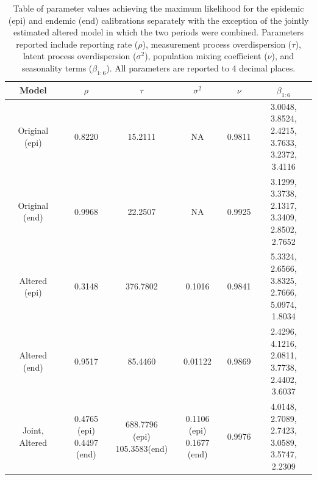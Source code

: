 \documentclass[12pt]{article}
\begin{document}
\renewcommand{\thefigure}{A\arabic{figure}}
\setcounter{figure}{0}
\renewcommand{\thetable}{A\arabic{table}}
\setcounter{table}{0}
\begin{table}[H]
\caption{Table of parameter values achieving the maximum likelihood for the epidemic (epi) and endemic (end) calibrations separately with the exception of the jointly estimated altered model in which the two periods were combined. Parameters reported include reporting rate ($\rho$), measurement process overdispersion ($\tau$), latent process overdispersion ($\sigma^2$), population mixing coefficient ($\nu$), and seasonality terms ($\beta_{1:6}$). All parameters are reported to 4 decimal places.}
\label{tab:A1}
\begin{center}
\begin{tabular}{||c | c c c c c ||}
 \hline
 Model & $\rho$ & $\tau$ & $\sigma^2$ & $\nu$ & $\beta_{1:6}$ \\ [0.5ex]
 \hline\hline
 Original (epi) & 0.8220 & 15.2111 & NA & 0.9811 & \makecell{3.0048, 3.8524,\\2.4215, 3.7633,\\3.2372, 3.4116}\\
 \hline
 Original (end) & 0.9968 & 22.2507 & NA & 0.9925 & \makecell{3.1299, 3.3738,\\2.1317, 3.3409,\\2.8502, 2.7652}\\
 \hline
 Altered (epi) & 0.3148 & 376.7802 & 0.1016 & 0.9841 & \makecell{5.3324, 2.6566,\\3.8325, 2.7666,\\5.0974, 1.8034}\\
 \hline
 Altered (end) & 0.9517 & 85.4460 & 0.01122 & 0.9869 & \makecell{2.4296, 4.1216,\\2.0811, 3.7738,\\2.4402, 3.6037}\\
 \hline
 Joint, Altered & \makecell{0.4765 (epi)\\0.4497 (end)} & \makecell{688.7796 (epi)\\105.3583(end)} & \makecell{0.1106 (epi)\\0.1677 (end)} & 0.9976 & \makecell{4.0148, 2.7089,\\2.7423, 3.0589,\\3.5747, 2.2309}\\
 \hline
\end{tabular}
\end{center}

\end{table}
\end{document}
